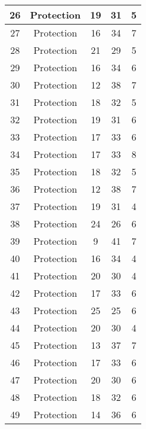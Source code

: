 \documentclass[results.tex]{subfiles}
\begin{document}
\begin{center}
\begin{tabular}{| c || c | c | c | c |}
    \hline
    26 & Protection & 19 & 31 & 5 \\ 
    \hline
    27 & Protection & 16 & 34 & 7 \\ 
    \hline
    28 & Protection & 21 & 29 & 5 \\ 
    \hline
    29 & Protection & 16 & 34 & 6 \\ 
    \hline
    30 & Protection & 12 & 38 & 7 \\ 
    \hline
    31 & Protection & 18 & 32 & 5 \\ 
    \hline
    32 & Protection & 19 & 31 & 6 \\ 
    \hline
    33 & Protection & 17 & 33 & 6 \\ 
    \hline
    34 & Protection & 17 & 33 & 8 \\ 
    \hline
    35 & Protection & 18 & 32 & 5 \\ 
    \hline
    36 & Protection & 12 & 38 & 7 \\ 
    \hline
    37 & Protection & 19 & 31 & 4 \\ 
    \hline
    38 & Protection & 24 & 26 & 6 \\ 
    \hline
    39 & Protection & 9 & 41 & 7 \\ 
    \hline
    40 & Protection & 16 & 34 & 4 \\ 
    \hline
    41 & Protection & 20 & 30 & 4 \\ 
    \hline
    42 & Protection & 17 & 33 & 6 \\ 
    \hline
    43 & Protection & 25 & 25 & 6 \\ 
    \hline
    44 & Protection & 20 & 30 & 4 \\ 
    \hline
    45 & Protection & 13 & 37 & 7 \\ 
    \hline
    46 & Protection & 17 & 33 & 6 \\ 
    \hline
    47 & Protection & 20 & 30 & 6 \\ 
    \hline
    48 & Protection & 18 & 32 & 6 \\ 
    \hline
    49 & Protection & 14 & 36 & 6 \\ 
    \hline   \end{tabular}
\end{center}
\end{document}
